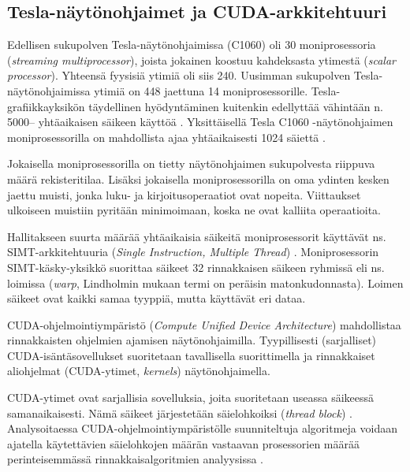 \documentclass[a4paper,11pt]{article}
\newcommand{\engl}[1]{\foreignlanguage{english}{\em #1}}
\begin{document}
\subsection{Tesla-näytönohjaimet ja CUDA-arkkitehtuuri}

Edellisen sukupolven Tesla-näytönohjaimissa (C1060) oli 30 moniprosessoria \\ (\engl{streaming multiprocessor}), joista jokainen koostuu kahdeksasta ytimestä (\engl{scalar processor}). Yhteensä fyysisiä ytimiä oli siis 240. Uusimman sukupolven Tes\-la-näy\-tön\-oh\-jai\-mis\-sa ytimiä on 448 jaettuna 14 moniprosessorille. Tesla-gra\-fiik\-ka\-yk\-si\-kön täydellinen hyödyntäminen kuitenkin edellyttää vähintään n. 5000\thinspace-- yhtäaikaisen säikeen käyttöä \cite{leischner2010}. Yksittäisellä Tesla C1060 -näytönohjaimen moniprosessorilla on mahdollista ajaa yhtäaikaisesti 1024 säiettä \cite{satish2009}.

Jokaisella moniprosessorilla on tietty näytönohjaimen sukupolvesta riippuva määrä rekisteritilaa. Lisäksi jokaisella moniprosessorilla on oma ydinten kesken jaettu muisti, jonka luku- ja kirjoitusoperaatiot ovat nopeita. Viittaukset ulkoiseen muistiin pyritään minimoimaan, koska ne ovat kalliita operaatioita.

Hallitakseen suurta määrää yhtäaikaisia säikeitä moniprosessorit käyttävät ns. SIMT-arkkitehtuuria (\engl{Single Instruction, Multiple Thread}) \cite{lindholm2008}. Moniprosessorin SIMT-käsky-yksikkö suorittaa säikeet 32 rinnakkaisen säikeen ryhmissä eli ns. loimissa (\engl{warp}, Lindholmin \cite{lindholm2008} mukaan termi on peräisin matonkudonnasta). Loimen säikeet ovat kaikki samaa tyyppiä, mutta käyttävät eri dataa.

CUDA-ohjelmointiympäristö (\engl{Compute Unified Device Architecture}) \cite{cudaprogramming} mahdollistaa rinnakkaisten ohjelmien ajamisen näytönohjaimilla. Tyypillisesti (sarjalliset) CUDA-isäntäsovellukset suoritetaan tavallisella suorittimella ja rinnakkaiset aliohjelmat (CUDA-ytimet, \engl{kernels}) näytönohjaimella.

CUDA-ytimet ovat sarjallisia sovelluksia, joita suoritetaan useassa säikeessä samanaikaisesti. Nämä säikeet järjestetään säielohkoiksi (\engl{thread block}) \cite{cudaprogramming}. Analysoitaessa CUDA-ohjelmointiympäristölle suunniteltuja algoritmeja voidaan ajatella käytettävien säielohkojen määrän vastaavan prosessorien määrää perinteisemmässä rinnakkaisalgoritmien analyysissa \cite{satish2009}.
\end{document}
